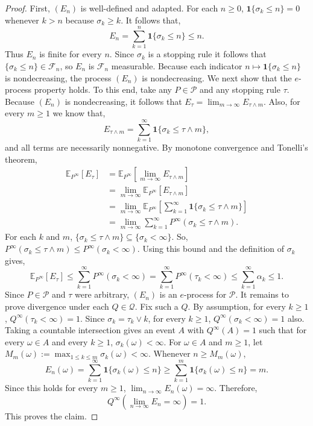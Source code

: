 \documentclass[11pt]{article}
\newcommand{\E}{\mathbb{E}}
\newcommand{\Pcal}{\mathcal{P}}
\newcommand{\Qcal}{\mathcal{Q}}
\newcommand{\one}{\mathbf{1}}
\theoremstyle{definition}
\theoremstyle{definition}
\begin{document}
\begin{proof}
First, $(E_n)$ is well-defined and adapted. For each $n\ge0$, $\one\{\sigma_k\le n\}=0$ whenever $k>n$ because $\sigma_k\ge k$. It follows that,
\[
E_n=\sum_{k=1}^n \one\{\sigma_k\le n\}\le n.
\]
Thus $E_n$ is finite for every $n$.  Since $\sigma_k$ is a stopping rule it follows that $\{\sigma_k\le n\}\in \mathcal F_n$, so $E_n$ is $\mathcal F_n$ measurable. Because each indicator $n\mapsto \one\{\sigma_k\le n\}$ is nondecreasing, the process $(E_n)$ is nondecreasing.  We next show that the $e$-process property holds. To this end, take any $P\in\Pcal$ and any stopping rule $\tau$. Because $(E_n)$ is nondecreasing, it follows that $E_\tau=\lim_{m\to\infty}E_{\tau\wedge m}$. Also, for every $m\ge 1$ we know that,
\[
E_{\tau\wedge m}=\sum_{k=1}^{\infty}\one\{\sigma_k\le \tau\wedge m\},
\]
and all terms are necessarily nonnegative. By monotone convergence and Tonelli's theorem,
\begin{align*}
\E_{P^\infty}[E_\tau]&=\E_{P^\infty}\left[\lim_{m\to\infty}E_{\tau\wedge m}\right]\\
&=\lim_{m\to\infty}\E_{P^\infty}[E_{\tau\wedge m}]\\
&= \lim_{m\to\infty}\E_{P^\infty}\left[\sum_{k=1}^{\infty}\one\{\sigma_k\le \tau\wedge m\}\right]\\
&= \lim_{m\to\infty}\sum_{k=1}^{\infty}P^{\infty}(\sigma_k\le \tau\wedge m).
\end{align*}
For each $k$ and $m$, $\{\sigma_k\le \tau\wedge m\}\subseteq \{\sigma_k<\infty\}$. So, $P^{\infty}(\sigma_k\le \tau\wedge m)\le P^{\infty}(\sigma_k<\infty)$. Using this bound and the definition of $\sigma_k$ gives,
\[
\E_{P^\infty}[E_\tau]\le \sum_{k=1}^{\infty}P^{\infty}(\sigma_k<\infty) = \sum_{k=1}^{\infty} P^{\infty}(\tau_k<\infty)\le \sum_{k=1}^{\infty} \alpha_k \le 1.
\]
Since $P\in\Pcal$ and $\tau$ were arbitrary, $(E_n)$ is an $e$-process for $\Pcal$. It remains to prove divergence under each $Q\in\Qcal$. Fix such a $Q$.  By assumption, for every $k\ge 1$, $Q^{\infty}(\tau_k<\infty)=1$. Since $\sigma_k=\tau_k\vee k$, for every $k\ge 1$, $Q^{\infty}(\sigma_k<\infty)=1$ also. Taking a countable intersection gives an event $A$ with $Q^{\infty}(A)=1$ such that for every $\omega\in A$ and every $k\ge1$, $\sigma_k(\omega)<\infty$. For $\omega\in A$ and $m\ge1$, let $M_m(\omega):=\max_{1\le k\le m}\sigma_k(\omega)<\infty$. Whenever $n\ge M_m(\omega)$,
\[
E_n(\omega)=\sum_{k=1}^\infty \one\{\sigma_k(\omega)\le n\} \ge \sum_{k=1}^m \one\{\sigma_k(\omega)\le n\}=m.
\]
Since this holds for every $m\ge1$, $\lim_{n\to\infty}E_n(\omega)=\infty$. Therefore, 
\[
Q^{\infty}\left(\lim_{n\to\infty}E_n=\infty\right)=1.
\]
This proves the claim.
\end{proof}
\end{document}
